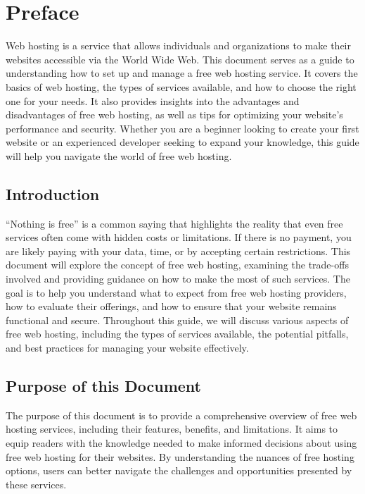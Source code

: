 \section{Preface}

Web hosting is a service that allows individuals and organizations to make their websites accessible via the World Wide Web. This document serves as a guide to understanding how to set up and manage a free web hosting service. It covers the basics of web hosting, the types of services available, and how to choose the right one for your needs. It also provides insights into the advantages and disadvantages of free web hosting, as well as tips for optimizing your website's performance and security. Whether you are a beginner looking to create your first website or an experienced developer seeking to expand your knowledge, this guide will help you navigate the world of free web hosting.

\subsection{Introduction}
``Nothing is free'' is a common saying that highlights the reality that even free services often come with hidden costs or limitations. If there is no payment, you are likely paying with your data, time, or by accepting certain restrictions. This document will explore the concept of free web hosting, examining the trade-offs involved and providing guidance on how to make the most of such services. The goal is to help you understand what to expect from free web hosting providers, how to evaluate their offerings, and how to ensure that your website remains functional and secure. Throughout this guide, we will discuss various aspects of free web hosting, including the types of services available, the potential pitfalls, and best practices for managing your website effectively.

\subsection{Purpose of this Document}
The purpose of this document is to provide a comprehensive overview of free web hosting services, including their features, benefits, and limitations. It aims to equip readers with the knowledge needed to make informed decisions about using free web hosting for their websites. By understanding the nuances of free hosting options, users can better navigate the challenges and opportunities presented by these services.

